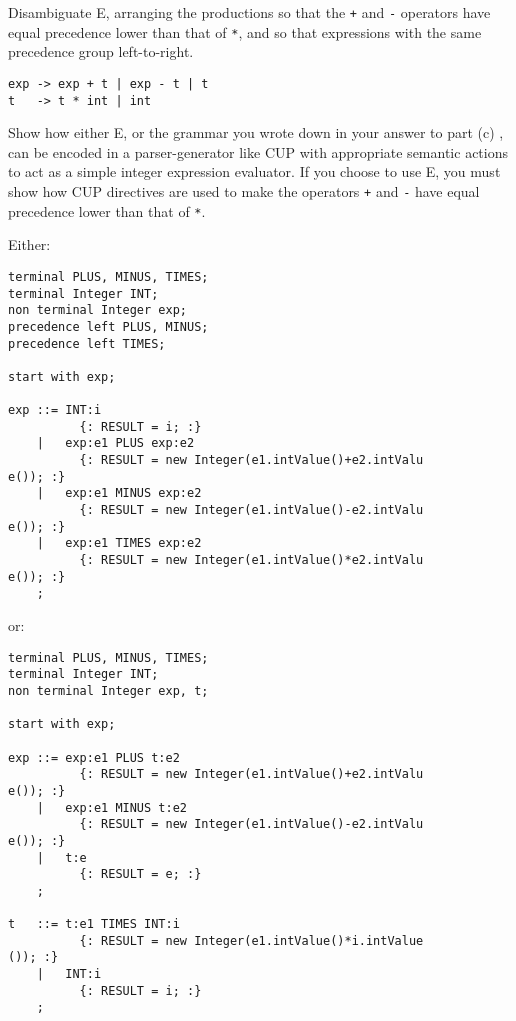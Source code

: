 \documentclass[11pt]{cityexam}
\begin{document}
\begin{questions}
\begin{subquestions}
\subquestion
Disambiguate E, arranging the productions so that
the \verb!+! and \verb!-! operators have equal precedence lower than that
of \verb!*!, and so that expressions with the same
precedence group left-to-right.

\begin{modelanswer}
\begin{verbatim}
exp -> exp + t | exp - t | t
t   -> t * int | int
\end{verbatim}
\end{modelanswer}


\subquestion
Show how either E, or the grammar you wrote down in your answer
to part (c) , can be encoded in a  parser-generator 
like CUP with appropriate semantic actions 
to act as a simple integer expression evaluator. 
If you choose to use E, you must show how CUP directives are used to make the
operators \verb!+! and \verb!-! have equal precedence lower than that
of \verb!*!.

\begin{modelanswer}
Either:
\begin{verbatim}
terminal PLUS, MINUS, TIMES;
terminal Integer INT;
non terminal Integer exp;
precedence left PLUS, MINUS;
precedence left TIMES;

start with exp;

exp ::= INT:i                   
          {: RESULT = i; :}
    |   exp:e1 PLUS exp:e2      
          {: RESULT = new Integer(e1.intValue()+e2.intValu
e()); :}
    |   exp:e1 MINUS exp:e2     
          {: RESULT = new Integer(e1.intValue()-e2.intValu
e()); :}
    |   exp:e1 TIMES exp:e2     
          {: RESULT = new Integer(e1.intValue()*e2.intValu
e()); :}
    ;
\end{verbatim}
or:
\begin{verbatim}
terminal PLUS, MINUS, TIMES;
terminal Integer INT;
non terminal Integer exp, t;

start with exp;

exp ::= exp:e1 PLUS t:e2        
          {: RESULT = new Integer(e1.intValue()+e2.intValu
e()); :}
    |   exp:e1 MINUS t:e2       
          {: RESULT = new Integer(e1.intValue()-e2.intValu
e()); :}
    |   t:e                     
          {: RESULT = e; :}
    ;

t   ::= t:e1 TIMES INT:i        
          {: RESULT = new Integer(e1.intValue()*i.intValue
()); :}
    |   INT:i                   
          {: RESULT = i; :}
    ;
\end{verbatim}
\end{modelanswer}


\end{subquestions}
\end{questions}
\end{document}
